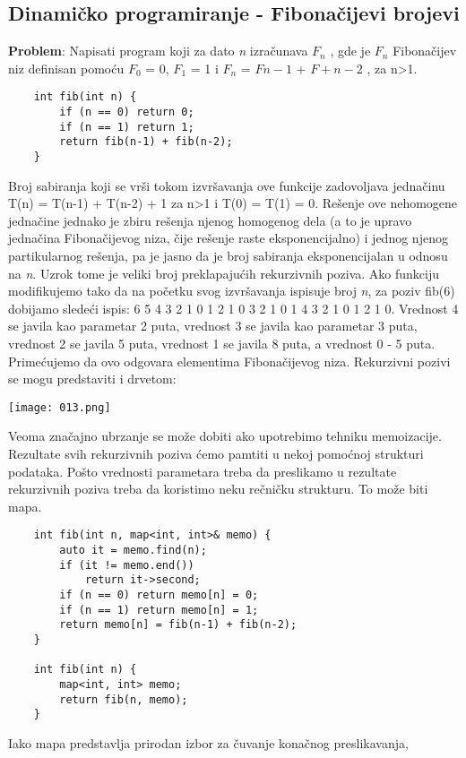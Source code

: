 \documentclass{article}
\begin{document}
\subsection{Dinamičko programiranje - Fibonačijevi brojevi}
\textbf{Problem}: Napisati program koji za dato \textit{n} izračunava 
$F_n$ , gde je $F_n$ Fibonačijev
niz definisan pomoću $F_0$ = 0, $F_1$ = 1 i $F_n$ = $F{n-1}$ + $F+{n-2}$ , za n>1.
\begin{lstlisting}
    int fib(int n) {
        if (n == 0) return 0;
        if (n == 1) return 1;
        return fib(n-1) + fib(n-2);
    }
\end{lstlisting}
Broj sabiranja koji se vrši tokom izvršavanja ove funkcije zadovoljava
jednačinu T(n) = T(n-1) + T(n-2) + 1 za n>1 i T(0) = T(1) = 0. Rešenje ove
nehomogene jednačine jednako je zbiru rešenja njenog homogenog dela (a to je
upravo jednačina Fibonačijevog niza, čije rešenje raste eksponencijalno) i jednog
njenog partikularnog rešenja, pa je jasno da je broj sabiranja eksponencijalan u
odnosu na \textit{n}. Uzrok tome je veliki broj preklapajućih rekurzivnih poziva. Ako
funkciju modifikujemo tako da na početku svog izvršavanja ispisuje broj \textit{n}, za
poziv fib(6) dobijamo sledeći ispis:
6 5 4 3 2 1 0 1 2 1 0 3 2 1 0 1 4 3 2 1 0 1 2 1 0.
Vrednost 4 se javila kao parametar 2 puta, vrednost 3 se javila kao parametar
3 puta, vrednost 2 se javila 5 puta, vrednost 1 se javila 8 puta, a vrednost 0 - 5
puta. Primećujemo da ovo odgovara elementima Fibonačijevog niza. Rekurzivni
pozivi se mogu predstaviti i drvetom:
\begin{center}
    \texttt{[image: 013.png]}
\end{center}
Veoma značajno ubrzanje se može dobiti ako upotrebimo tehniku memoizacije.
Rezultate svih rekurzivnih poziva ćemo pamtiti u nekoj pomoćnoj strukturi podataka. Pošto vrednosti parametara treba da preslikamo u rezultate rekurzivnih
poziva treba da koristimo neku rečničku strukturu. To može biti mapa.
\begin{lstlisting}
    int fib(int n, map<int, int>& memo) {
        auto it = memo.find(n);
        if (it != memo.end())
            return it->second;
        if (n == 0) return memo[n] = 0;
        if (n == 1) return memo[n] = 1;
        return memo[n] = fib(n-1) + fib(n-2);
    }
    
    int fib(int n) {
        map<int, int> memo;
        return fib(n, memo);
    }
\end{lstlisting}
Iako mapa predstavlja prirodan izbor za čuvanje konačnog preslikavanja,
\end{document}
